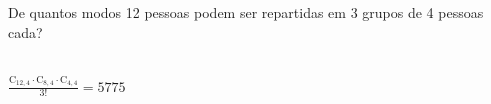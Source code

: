\begin{ex}
 De quantos modos 12 pessoas podem ser repartidas em 3 grupos de 4 pessoas cada?
   \begin{sol}
     \phantom{A}  \\
     $\frac{\mathrm{C}_{{12},4}\cdot\mathrm{C}_{8,4}\cdot\mathrm{C}_{4,4}}{3!}=5775$
   \end{sol}
   
\end{ex}